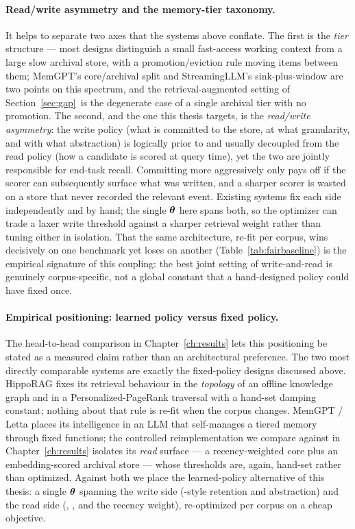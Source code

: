 \paragraph{Read/write asymmetry and the memory-tier taxonomy.}
It helps to separate two axes that the systems above conflate. The first is the
\emph{tier} structure --- most designs distinguish a small fast-access working
context from a large slow archival store, with a promotion/eviction rule moving
items between them; MemGPT's core/archival split \citep{packer2023memgpt} and
StreamingLLM's sink-plus-window \citep{xiao2024streamingllm} are two points on
this spectrum, and the retrieval-augmented setting of
Section~\ref{sec:gap}\ is the degenerate case of a single archival tier with no
promotion. The second, and the one this thesis targets, is the
\emph{read/write asymmetry}: the write policy (what is committed to the store,
at what granularity, and with what abstraction) is logically prior to and
usually decoupled from the read policy (how a candidate is scored at query
time), yet the two are jointly responsible for end-task recall. Committing more
aggressively only pays off if the scorer can subsequently surface what was
written, and a sharper scorer is wasted on a store that never recorded the
relevant event. Existing systems fix each side independently and by hand; the
single $\boldsymbol{\theta}$ here spans both, so the optimizer can trade a laxer write
threshold against a sharper retrieval weight rather than tuning either in
isolation. That the same architecture, re-fit per corpus, wins decisively on one
benchmark yet loses on another (Table~\ref{tab:fairbaseline}) is the empirical
signature of this coupling: the best joint setting of write-and-read is genuinely
corpus-specific, not a global constant that a hand-designed policy could have
fixed once.

\paragraph{Empirical positioning: learned policy versus fixed policy.}
The head-to-head comparison in Chapter~\ref{ch:results} lets this positioning
be stated as a measured claim rather than an architectural preference. The two
most directly comparable systems are exactly the fixed-policy designs discussed
above. HippoRAG \citep{gutierrez2024hipporag} fixes its retrieval behaviour in
the \emph{topology} of an offline knowledge graph and in a
Personalized-PageRank traversal with a hand-set damping constant; nothing about
that rule is re-fit when the corpus changes. MemGPT / Letta
\citep{packer2023memgpt} places its intelligence in an LLM that self-manages a
tiered memory through fixed functions; the controlled reimplementation we compare
against in Chapter~\ref{ch:results} isolates its \emph{read} surface --- a
recency-weighted core plus an embedding-scored archival store --- whose thresholds
are, again, hand-set rather than optimized. Against both we place the
learned-policy alternative of this thesis: a single $\boldsymbol{\theta}$ spanning the
write side (\wrec{}-style retention and abstraction) and the read side
(\wembed{}, \wgraph{}, and the recency weight), re-optimized per corpus on a
cheap \recallk{} objective.

